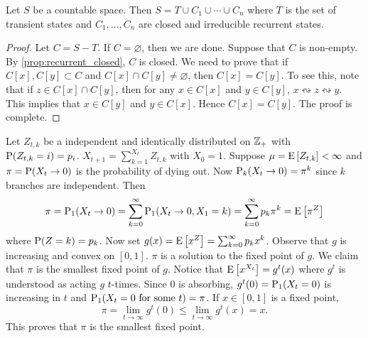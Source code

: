 \begin{theorem}
    Let $S$ be a countable space. Then $S = T\cup C_1\cup\cdots\cup C_n$ where 
    $T$ is the set of transient states and $C_1,\ldots,C_n$ are 
    closed and irreducible recurrent states. 
\end{theorem}
\begin{proof}
    Let $C = S-T$. If $C = \varnothing$, then we are done. Suppose 
    that $C$ is non-empty. By \cref{prop:recurrent_closed}, 
    $C$ is closed. We need to prove that if $C[x],C[y]\subset C$ and
    $C[x]\cap C[y]\neq \varnothing$, then $C[x] = C[y]$. 
    To see this, note that if $z\in C[x]\cap C[y]$, then 
    for any $x\in C[x]$ and $y\in C[y]$, $x\leftrightsquigarrow z 
    \leftrightsquigarrow y$. This implies that $x\in C[y]$ 
    and $y\in C[x]$. Hence $C[x] = C[y]$. The proof is complete. 
\end{proof}

\begin{example}
    Let $Z_{t,k}$ be a independent and identically distributed on $\Z_+$ 
    with $\P(Z_{t,k} = i) = p_i$. $X_{t+1} = \sum_{k=1}^{X_t}Z_{t,k}$ with 
    $X_0 = 1$. Suppose $\mu = \E\sbrc{Z_{t,k}}<\infty$ and $\pi = \P(X_t\to 0)$ 
    is the probability of dying out. Now $\P_k(X_t\to 0) = \pi^k$ since $k$ 
    branches are independent. Then 
    \begin{equation*}
        \pi = \P_1(X_t\to 0) = \sum_{k=0}^\infty \P_1(X_t \to 0, X_1 = k) 
        = \sum_{k=0}^\infty p_k\pi^k = \E\sbrc{\pi^Z}
    \end{equation*}
    where $\P(Z = k) = p_k$. Now set $g(x) = \E\sbrc{x^Z} = \sum_{k=0}^\infty p_kx^k$.
    Observe that $g$ is increasing and convex on $[0,1]$. $\pi$ is a solution 
    to the fixed point of $g$. We claim that $\pi$ is the smallest fixed point 
    of $g$. Notice that $\E\sbrc{x^{X_t}} = g^t(x)$ where $g^t$ is understood 
    as acting $g$ $t$-times. Since $0$ is absorbing, $g^t(0) = \P_1(X_t = 0)$ 
    is increasing in $t$ and $\P_1(X_t = 0\text{ for some $t$}) = \pi$. 
    If $x\in [0,1]$ is a fixed point,  
    \begin{equation*}
        \pi = \lim_{t\to\infty}g^t(0)\leq \lim_{t\to\infty}g^t(x) = x. 
    \end{equation*}
    This proves that $\pi$ is the smallest fixed point. 
\end{example}